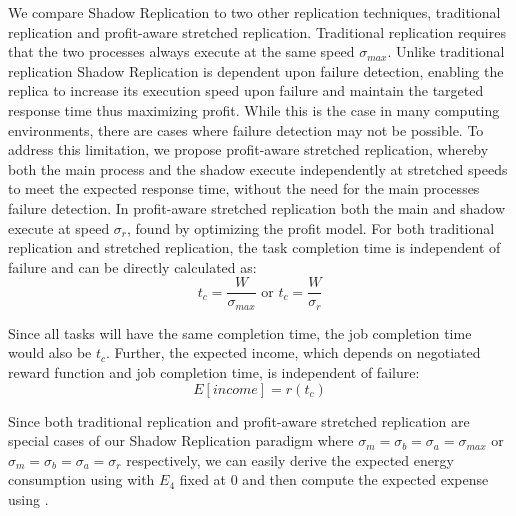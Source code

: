 \noindent 

We compare Shadow Replication to two other replication techniques,
traditional replication and profit-aware stretched replication.
Traditional replication requires that the two processes always execute
at the same speed $\sigma_{max}$. Unlike traditional replication
Shadow Replication is dependent upon failure detection, enabling the
replica to increase its execution speed upon failure and maintain the
targeted response time thus maximizing profit. While this is the case
in many computing environments, there are cases where failure
detection may not be possible. To address this limitation, we propose
profit-aware stretched replication, whereby both the main process and
the shadow execute independently at stretched speeds to meet the
expected response time, without the need for the main processes failure
detection. In profit-aware stretched replication both the main and
shadow execute at speed $\sigma_r$, found by optimizing the profit
model.  For both traditional replication and stretched replication,
the task completion time is independent of failure and can be directly
calculated as:
\begin{equation}
t_c=\frac{W}{\sigma_{max}} \text{ or } t_c=\frac{W}{\sigma_r}
\end{equation}



Since all tasks will have the same completion time, the job completion
time would also be $t_c$. Further, the expected income, which depends
on negotiated reward function and job completion time, is independent
of failure:
\begin{equation}
E[income]=r(t_c)
\end{equation}

Since both traditional replication and profit-aware stretched
replication are special cases of our Shadow Replication paradigm where
$\sigma_m=\sigma_b=\sigma_a=\sigma_{max}$ or
$\sigma_m=\sigma_b=\sigma_a=\sigma_r$ respectively, we can easily derive the
expected energy consumption using  with $E_4$
fixed at 0 and then compute the expected expense using .

